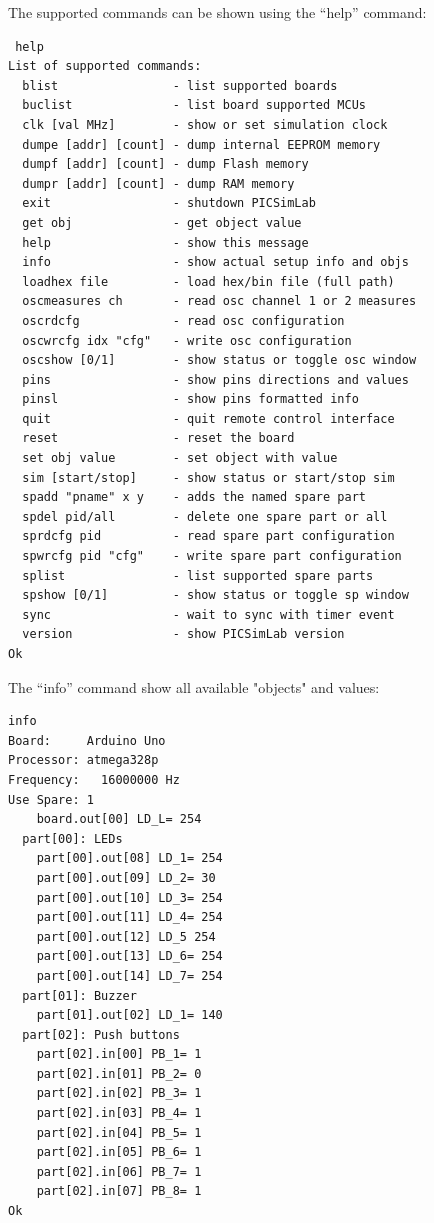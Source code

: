 The supported commands can be shown using the ``help'' command:  
\begin{verbatim}
 help
List of supported commands:
  blist                - list supported boards
  buclist              - list board supported MCUs
  clk [val MHz]        - show or set simulation clock
  dumpe [addr] [count] - dump internal EEPROM memory
  dumpf [addr] [count] - dump Flash memory
  dumpr [addr] [count] - dump RAM memory
  exit                 - shutdown PICSimLab
  get obj              - get object value
  help                 - show this message
  info                 - show actual setup info and objs
  loadhex file         - load hex/bin file (full path)
  oscmeasures ch       - read osc channel 1 or 2 measures
  oscrdcfg             - read osc configuration
  oscwrcfg idx "cfg"   - write osc configuration
  oscshow [0/1]        - show status or toggle osc window
  pins                 - show pins directions and values
  pinsl                - show pins formatted info
  quit                 - quit remote control interface
  reset                - reset the board
  set obj value        - set object with value
  sim [start/stop]     - show status or start/stop sim
  spadd "pname" x y    - adds the named spare part
  spdel pid/all        - delete one spare part or all
  sprdcfg pid          - read spare part configuration
  spwrcfg pid "cfg"    - write spare part configuration
  splist               - list supported spare parts
  spshow [0/1]         - show status or toggle sp window
  sync                 - wait to sync with timer event
  version              - show PICSimLab version
Ok
\end{verbatim}
  

The ``info'' command show all available "objects" and values:
\begin{verbatim}
info
Board:     Arduino Uno
Processor: atmega328p
Frequency:   16000000 Hz
Use Spare: 1
    board.out[00] LD_L= 254
  part[00]: LEDs
    part[00].out[08] LD_1= 254
    part[00].out[09] LD_2= 30
    part[00].out[10] LD_3= 254
    part[00].out[11] LD_4= 254
    part[00].out[12] LD_5 254
    part[00].out[13] LD_6= 254
    part[00].out[14] LD_7= 254
  part[01]: Buzzer
    part[01].out[02] LD_1= 140
  part[02]: Push buttons
    part[02].in[00] PB_1= 1
    part[02].in[01] PB_2= 0
    part[02].in[02] PB_3= 1
    part[02].in[03] PB_4= 1
    part[02].in[04] PB_5= 1
    part[02].in[05] PB_6= 1
    part[02].in[06] PB_7= 1
    part[02].in[07] PB_8= 1
Ok
\end{verbatim}

